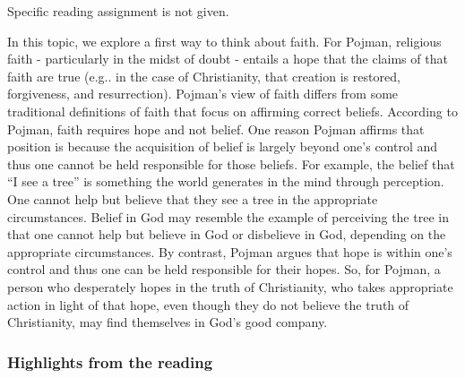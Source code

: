 \documentclass[
]{book}
\begin{document}
\begin{reflect}
{Specific reading assignment is not given.}
\end{reflect}

In this topic, we explore a first way to think about faith. For Pojman, religious faith - particularly in the midst of doubt - entails a hope that the claims of that faith are true (e.g.. in the case of Christianity, that creation is restored, forgiveness, and resurrection). Pojman's view of faith differs from some traditional definitions of faith that focus on affirming correct beliefs. According to Pojman, faith requires hope and not belief. One reason Pojman affirms that position is because the acquisition of belief is largely beyond one's control and thus one cannot be held responsible for those beliefs. For example, the belief that ``I see a tree'' is something the world generates in the mind through perception. One cannot help but believe that they see a tree in the appropriate circumstances. Belief in God may resemble the example of perceiving the tree in that one cannot help but believe in God or disbelieve in God, depending on the appropriate circumstances. By contrast, Pojman argues that hope is within one's control and thus one can be held responsible for their hopes. So, for Pojman, a person who desperately hopes in the truth of Christianity, who takes appropriate action in light of that hope, even though they do not believe the truth of Christianity, may find themselves in God's good company.

\hypertarget{highlights-from-the-reading-6}{%
\subsubsection*{Highlights from the reading}\label{highlights-from-the-reading-6}}
\end{document}
